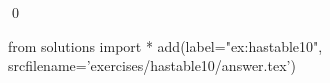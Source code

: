 
\begin{ex} 
  \label{ex:hastable10}
  
  \qed
\end{ex} 
\begin{python0}
from solutions import *
add(label="ex:hastable10",
    srcfilename='exercises/hastable10/answer.tex') 
\end{python0}
